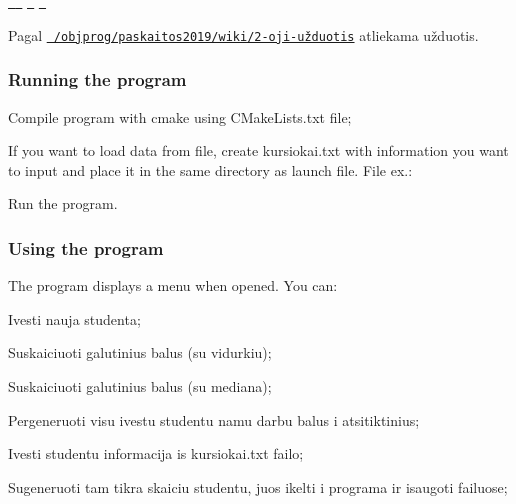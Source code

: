 \href{https://github.com/nogalosa/DuomenuApdorojimasCPP/commits/master}{\texttt{ }} \href{https://github.com/nogalosa/DuomenuApdorojimasCPP/commits/master}{\texttt{ }} \href{https://github.com/nogalosa/DuomenuApdorojimasCPP/commits/master}{\texttt{ }} \href{https://github.com/nogalosa/DuomenuApdorojimasCPP/commits/master}{\texttt{ }}

Pagal \href{https://github.com/objprog/paskaitos2019/wiki/2-oji-u%C5%BEduotis}{\texttt{ /objprog/paskaitos2019/wiki/2-\/oji-\/užduotis}} atliekama užduotis.





\subsubsection*{Running the program}


\begin{DoxyItemize}
\item Compile program with cmake using C\+Make\+Lists.\+txt file;
\item If you want to load data from file, create kursiokai.\+txt with information you want to input and place it in the same directory as launch file. File ex.\+: 
\begin{DoxyCode}{0}
\end{DoxyCode}

\item Run the program.
\end{DoxyItemize}





\subsubsection*{Using the program}

The program displays a menu when opened. You can\+:
\begin{DoxyEnumerate}
\item Ivesti nauja studenta;
\item Suskaiciuoti galutinius balus (su vidurkiu);
\item Suskaiciuoti galutinius balus (su mediana);
\item Pergeneruoti visu ivestu studentu namu darbu balus i atsitiktinius;
\item Ivesti studentu informacija is kursiokai.\+txt failo;
\item Sugeneruoti tam tikra skaiciu studentu, juos ikelti i programa ir isaugoti failuose;
\end{DoxyEnumerate}

